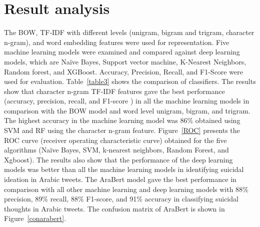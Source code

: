 \documentclass[sn-mathphys,Numbered]{sn-jnl}%
\begin{document}
\section{Result analysis}
\label{Sec:result} 
The BOW, TF-IDF with different levels (unigram, bigram and trigram, character n-gram), and word embedding features were used for representation. %
Five machine learning models were examined and compared against deep learning models, which are Naïve Bayes, Support vector machine, K-Nearest Neighbors, Random forest, and XGBoost. Accuracy, Precision, Recall, and F1-Score were used for evaluation. Table~\ref{table3} shows the comparison of classifiers. The results show that character n-gram TF-IDF features gave the best performance (accuracy, precision, recall, and F1-score ) in all the machine learning models in comparison with the BOW model and word level unigram, bigram, and trigram. The highest accuracy in the machine learning model was 86\% obtained using SVM and RF using the character n-gram feature. Figure~\ref{ROC} presents the ROC curve (receiver operating characteristic curve) obtained for the five algorithms (Naïve Bayes, SVM, k-nearest neighbors, Random Forest, and Xgboost). 
%
The results also show that the performance of the deep learning models was better than all the machine learning models in identifying suicidal ideation in Arabic tweets. The AraBert model gave the best performance in comparison with all other machine learning and deep learning models with 88\% precision, 89\% recall, 88\% F1-score, and 91\% accuracy in classifying suicidal thoughts in Arabic tweets. The confusion matrix of AraBert is shown in Figure~\ref{conarabert}.
\end{document}
